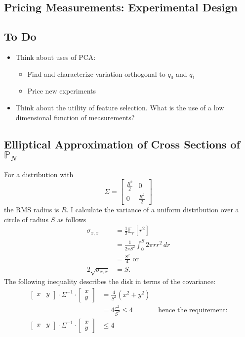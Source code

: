 \documentclass[]{article}
\newcommand{\field}[1]{\mathbb{#1}}
\newcommand\Polytope[1]{\field{P}_{#1}}
\newcommand\PolytopeN{\Polytope{N}}
\newcommand{\EV}[2]{\field{E}_{#1}\left[#2\right]}
\begin{document}
\subsection{Pricing Measurements: Experimental Design}
\label{sec:pricing}

\subsection{To Do}
\begin{itemize}
\item Think about uses of PCA:
  \begin{itemize}
  \item Find and characterize variation orthogonal to $q_0$ and $q_1$
  \item Price new experiments
  \end{itemize}
\item Think about the utility of feature selection.  What is the use
  of a low dimensional function of measurements?
\end{itemize}

\subsection{Elliptical Approximation of Cross Sections of
  $\PolytopeN$}
\label{sec:ellipse}
For a distribution with
\begin{equation*}
  \Sigma = \begin{bmatrix} \frac{R^2}{2} &0 \\ 0 &
    \frac{R^2}{2} \end{bmatrix} 
\end{equation*}
the RMS radius is $R$.  I calculate the variance of a uniform
distribution over a circle of radius $S$ as follows
\begin{align*}
  \sigma_{x,x} &= \frac{1}{2} \EV{r}{r^2} \\
  &= \frac{1}{2\pi S^2} \int_0^S 2\pi r r^2 \, dr \\
  &= \frac{S^2}{4} \text{ or}\\
  2\sqrt{\sigma_{x,x}} &= S.
\end{align*}
The following inequality describes the disk in terms of the covariance:
\begin{align*}
  \begin{bmatrix} x & y \end{bmatrix} \cdot \Sigma^{-1}
  \cdot \begin{bmatrix} x\\y \end{bmatrix} &= \frac{4}{S^2} 
  \left( x^2 + y^2 \right) \\
  &= 4 \frac{r^2}{S^2} \leq 4 &\text{ hence the requirement:} \\
  \begin{bmatrix} x & y \end{bmatrix} \cdot \Sigma^{-1}
  \cdot \begin{bmatrix} x\\y \end{bmatrix} &\leq 4  
\end{align*}
\end{document}
